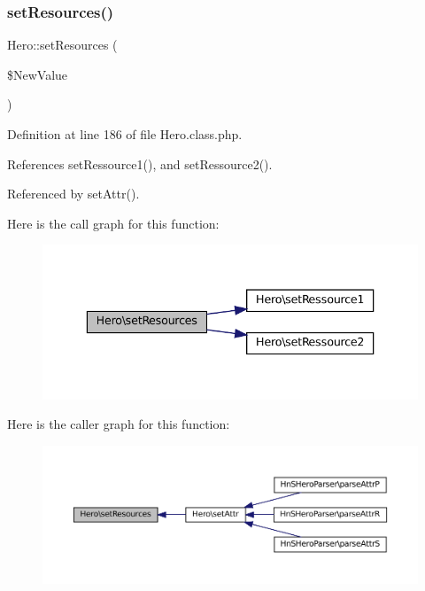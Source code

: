 \subsubsection{\texorpdfstring{set\+Resources()}{setResources()}}
{\footnotesize\ttfamily Hero\+::set\+Resources (\begin{DoxyParamCaption}\item[{}]{\$\+New\+Value }\end{DoxyParamCaption})}



Definition at line 186 of file Hero.\+class.\+php.



References set\+Ressource1(), and set\+Ressource2().



Referenced by set\+Attr().

Here is the call graph for this function\+:\nopagebreak
\begin{figure}[H]
\begin{center}
\leavevmode
\includegraphics[width=336pt]{class_hero_a136f0b99dae0a4f99d9e30193ee3972a_cgraph}
\end{center}
\end{figure}
Here is the caller graph for this function\+:\nopagebreak
\begin{figure}[H]
\begin{center}
\leavevmode
\includegraphics[width=350pt]{class_hero_a136f0b99dae0a4f99d9e30193ee3972a_icgraph}
\end{center}
\end{figure}
\mbox{\label{class_hero_ab322ecf2edd6cec527d0d2715a1cfa1c}} 
